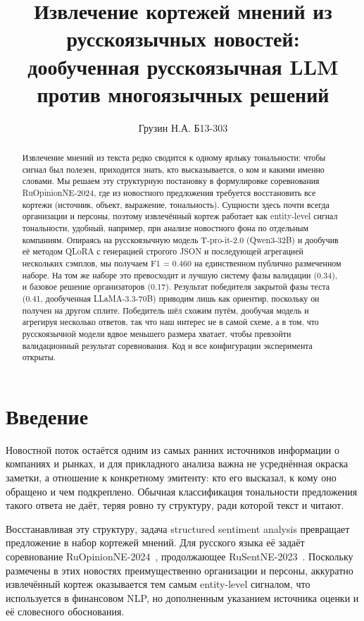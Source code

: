 \documentclass[11pt]{article}
\title{Извлечение кортежей мнений из русскоязычных новостей:\\
дообученная русскоязычная LLM против многоязычных решений}
\author{Грузин Н.А. Б13-303}
\date{}
\begin{document}
\maketitle

\begin{abstract}
Извлечение мнений из текста редко сводится к одному ярлыку тональности: чтобы сигнал был полезен,
приходится знать, кто высказывается, о ком и какими именно словами. Мы решаем эту структурную постановку
в формулировке соревнования RuOpinionNE-2024, где из новостного предложения требуется восстановить все
кортежи (источник, объект, выражение, тональность). Сущности здесь почти всегда
организации и персоны, поэтому извлечённый кортеж работает как entity-level сигнал тональности, удобный, например,
при анализе новостного фона по отдельным компаниям. Опираясь на русскоязычную модель T-pro-it-2.0 (Qwen3-32B) и дообучив
её методом QLoRA с генерацией строгого JSON и последующей агрегацией нескольких сэмплов, мы получаем
F1 = 0.460 на единственном публично размеченном наборе. На том же наборе это превосходит и лучшую систему
фазы валидации (0.34), и базовое решение организаторов (0.17). Результат победителя закрытой фазы теста
(0.41, дообученная LLaMA-3.3-70B) приводим лишь как ориентир, поскольку он получен на другом сплите. Победитель шёл схожим путём, дообучая модель и агрегируя несколько ответов,
так что наш интерес не в самой схеме, а в том, что русскоязычной модели вдвое меньшего размера хватает, чтобы
превзойти валидационный результат соревнования.
Код и все конфигурации эксперимента открыты.
\end{abstract}

\section{Введение}
Новостной поток остаётся одним из самых ранних источников информации о компаниях и рынках, и для прикладного
анализа важна не усреднённая окраска заметки, а отношение к конкретному эмитенту: кто его высказал, к кому оно
обращено и чем подкреплено. Обычная классификация тональности предложения такого ответа не даёт, теряя ровно ту структуру,
ради которой текст и читают.

Восстанавливая эту структуру, задача structured sentiment analysis превращает предложение в набор кортежей
мнений. Для русского языка её задаёт соревнование RuOpinionNE-2024~\cite{ruopinionne2024}, продолжающее
RuSentNE-2023~\cite{rusentne2023}. Поскольку размечены в этих новостях преимущественно организации и персоны,
аккуратно извлечённый кортеж оказывается тем самым entity-level сигналом, что используется в финансовом NLP,
но дополненным указанием источника оценки и её словесного обоснования.
\end{document}
